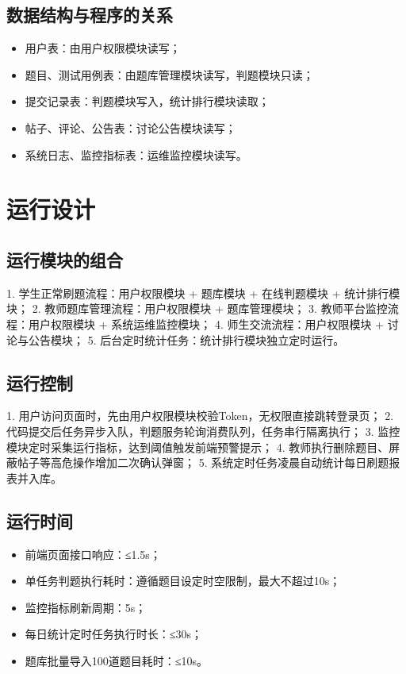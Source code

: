 \documentclass{../template/softeng}
\begin{document}
\subsection{数据结构与程序的关系}
\begin{itemize}
    \item 用户表：由用户权限模块读写；
    \item 题目、测试用例表：由题库管理模块读写，判题模块只读；
    \item 提交记录表：判题模块写入，统计排行模块读取；
    \item 帖子、评论、公告表：讨论公告模块读写；
    \item 系统日志、监控指标表：运维监控模块读写。
\end{itemize}

\section{运行设计}
\subsection{运行模块的组合}
1. 学生正常刷题流程：用户权限模块 + 题库模块 + 在线判题模块 + 统计排行模块；
2. 教师题库管理流程：用户权限模块 + 题库管理模块；
3. 教师平台监控流程：用户权限模块 + 系统运维监控模块；
4. 师生交流流程：用户权限模块 + 讨论与公告模块；
5. 后台定时统计任务：统计排行模块独立定时运行。

\subsection{运行控制}
1. 用户访问页面时，先由用户权限模块校验Token，无权限直接跳转登录页；
2. 代码提交后任务异步入队，判题服务轮询消费队列，任务串行隔离执行；
3. 监控模块定时采集运行指标，达到阈值触发前端预警提示；
4. 教师执行删除题目、屏蔽帖子等高危操作增加二次确认弹窗；
5. 系统定时任务凌晨自动统计每日刷题报表并入库。

\subsection{运行时间}
\begin{itemize}
    \item 前端页面接口响应：≤1.5s；
    \item 单任务判题执行耗时：遵循题目设定时空限制，最大不超过10s；
    \item 监控指标刷新周期：5s；
    \item 每日统计定时任务执行时长：≤30s；
    \item 题库批量导入100道题目耗时：≤10s。
\end{itemize}
\end{document}
